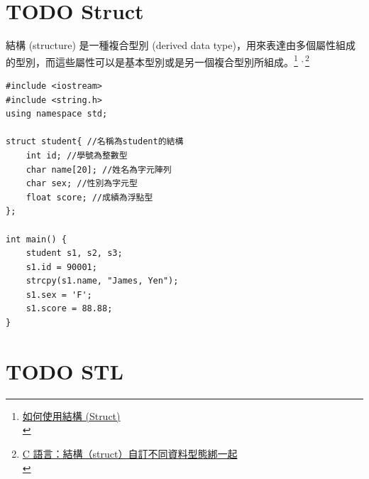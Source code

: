 \documentclass[a4paper,12pt]{article}
\begin{document}
\section{{\bfseries\sffamily TODO} Struct}
\label{cpp_struct}
結構 (structure) 是一種複合型別 (derived data type)，用來表達由多個屬性組成的型別，而這些屬性可以是基本型別或是另一個複合型別所組成。\footnote{\href{https://michaelchen.tech/c-programming/struct/}{如何使用結構 (Struct)}\\} \textsuperscript{,}\,\footnote{\href{https://kopu.chat/2017/05/30/c-\%E8\%AA\%9E\%E8\%A8\%80\%EF\%BC\%9A\%E7\%B5\%90\%E6\%A7\%8B\%EF\%BC\%88struct\%EF\%BC\%89\%E8\%87\%AA\%E8\%A8\%82\%E4\%B8\%8D\%E5\%90\%8C\%E8\%B3\%87\%E6\%96\%99\%E5\%9E\%8B\%E6\%85\%8B\%E7\%B6\%81\%E4\%B8\%80\%E8\%B5\%B7/}{C 語言：結構（struct）自訂不同資料型態綁一起}\\}\\
\lstset{breaklines=true,language=cpp,label= ,caption= ,captionpos=b,firstnumber=1,numbers=left}
\begin{lstlisting}
#include <iostream>
#include <string.h>
using namespace std;

struct student{ //名稱為student的結構
    int id; //學號為整數型
    char name[20]; //姓名為字元陣列
    char sex; //性別為字元型
    float score; //成績為浮點型
};

int main() {
    student s1, s2, s3;
    s1.id = 90001;
    strcpy(s1.name, "James, Yen");
    s1.sex = 'F';
    s1.score = 88.88;
}

\end{lstlisting}

\section{{\bfseries\sffamily TODO} STL}
\label{sec:orgf69c929}
\end{document}
